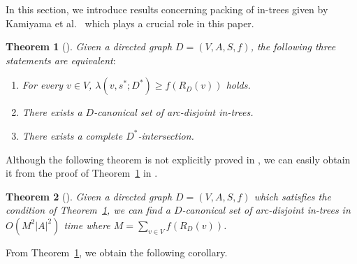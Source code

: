 \documentclass[11pt]{article}
\newcounter{ni}
\theoremstyle{plain}
\newtheorem{theorem}{Theorem}[section]
\begin{document}
In this section, we introduce results concerning packing of in-trees given by 
Kamiyama et al.~\cite{KKT08} which plays a crucial role in this paper.  

\begin{theorem}[\cite{KKT08}] \label{theorem:KKT08}
Given a directed graph  $D=(V,A,S,f)$, the following three statements are equivalent$\colon$
\begin{enumerate}
\item For every $v \in V$, $\lambda(v,s^{\ast};D^{\ast})\ge f(R_D(v))$ holds.
\item There exists a $D$-canonical set of arc-disjoint in-trees. 
\item There exists a complete $D^{\ast}$-intersection. 
\end{enumerate}
\end{theorem}

Although the following theorem is not explicitly proved in \cite{KKT08},
we can easily obtain it from the proof of Theorem~\ref{theorem:KKT08} in \cite{KKT08}. 

\begin{theorem}[\cite{KKT08}] \label{theorem2:KKT08}
Given a directed graph  $D=(V,A,S,f)$ which satisfies the condition of 
Theorem~\ref{theorem:KKT08}, we can find a $D$-canonical set of arc-disjoint
in-trees in $O(M^2|A|^2)$ time where $M=\sum_{v \in V}f(R_D(v))$.
\end{theorem}

From Theorem~\ref{theorem:KKT08}, we obtain the following corollary. 
\end{document}
